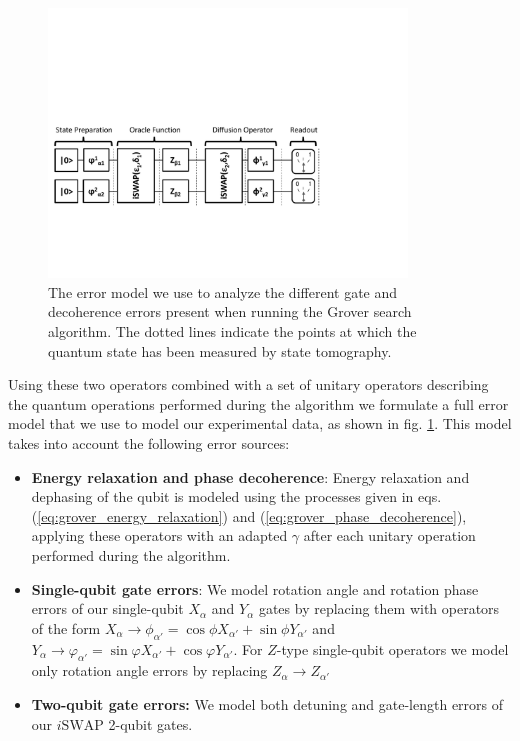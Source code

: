 \smallskip

\begin{figure}[ht!]
	\centering
		\includegraphics[width=0.85\textwidth]{"./material/papers/grover/grover_error_model"}
	\caption[Error model used for analyzing gate and decoherence errors for the Grover search algorithm]{The error model we use to analyze the different gate and decoherence errors present when running the Grover search algorithm. The dotted lines indicate the points at which the quantum state has been measured by state tomography.}
	\label{fig:GroverErrorModel}
\end{figure}


Using these two operators combined with a set of unitary operators describing the quantum operations performed during the algorithm we formulate a full error model that we use to model our experimental data, as shown in fig. \ref{fig:GroverErrorModel}. This model takes into account the following error sources:

\begin{itemize}
 \item {\bf Energy relaxation and phase decoherence}: Energy relaxation and dephasing of the qubit is modeled using the processes given in eqs. (\ref{eq:grover_energy_relaxation}) and (\ref{eq:grover_phase_decoherence}), applying these operators with an adapted $\gamma$ after each unitary operation performed during the algorithm.
 \item {\bf Single-qubit gate errors}: We model rotation angle and rotation phase errors of our single-qubit $X_\alpha$ and $Y_\alpha$ gates by replacing them with operators of the form $X_\alpha\to \phi_{\alpha'} = \cos{\phi}X_{\alpha'}+\sin{\phi}Y_{\alpha'}$ and $Y_\alpha \to \varphi_{\alpha'} = \sin{\varphi}X_{\alpha'}+\cos{\varphi}Y_{\alpha'}$. For $Z$-type single-qubit operators we model only rotation angle errors by replacing $Z_\alpha \to Z_{\alpha'}$ 
 \item {\bf Two-qubit gate errors:} We model both detuning and gate-length errors of our $i\mathrm{SWAP}$ 2-qubit gates.
\end{itemize}

